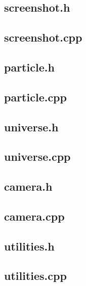 \documentclass[10pt,a4paper]{article}
\begin{document}
\subsection{screenshot.h}

\subsection{screenshot.cpp}

\clearpage
\subsection{particle.h}

\subsection{particle.cpp}

\clearpage
\subsection{universe.h}

\subsection{universe.cpp}

\clearpage
\subsection{camera.h}

\subsection{camera.cpp}

\clearpage
\subsection{utilities.h}

\subsection{utilities.cpp}

\end{document}
